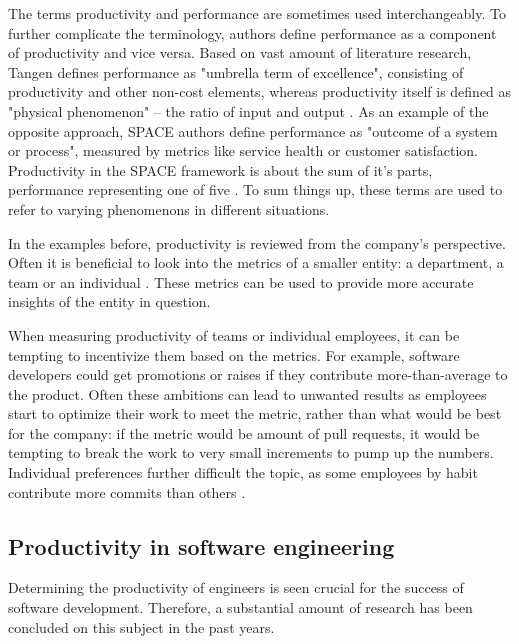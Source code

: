 The terms productivity and performance are sometimes used interchangeably. To further complicate the terminology, authors define performance as a component of productivity and vice versa. Based on vast amount of literature research, Tangen defines performance as "umbrella term of excellence", consisting of productivity and other non-cost elements, whereas productivity itself is defined as "physical phenomenon" – the ratio of input and output \cite{tangen_demystifying_2005}. As an example of the opposite approach, SPACE authors define performance as "outcome of a system or process", measured by metrics like service health or customer satisfaction. Productivity in the SPACE framework is about the sum of it's parts, performance representing one of five \cite{forsgren_space_2021}. To sum things up, these terms are used to refer to varying phenomenons in different situations.

In the examples before, productivity is reviewed from the company's perspective. Often it is beneficial to look into the metrics of a smaller entity: a department, a team or an individual \cite{forsgren_space_2021, tangen_demystifying_2005}. These metrics can be used to provide more accurate insights of the entity in question.

When measuring productivity of teams or individual employees, it can be tempting to incentivize them based on the metrics. For example, software developers could get promotions or raises if they contribute more-than-average to the product. Often these ambitions can lead to unwanted results as employees start to optimize their work to meet the metric, rather than what would be best for the company\cite{symons_software_2010, chew_no-nonsense_1988}: if the metric would be amount of pull requests, it would be tempting to break the work to very small increments to pump up the numbers. Individual preferences further difficult the topic, as some employees by habit contribute more commits than others \cite{oliveira_code_2020}. 

\subsection{Productivity in software engineering}

Determining the productivity of engineers is seen crucial for the success of software development. Therefore, a substantial amount of research has been concluded on this subject in the past years.\cite{oliveira_code_2020}

